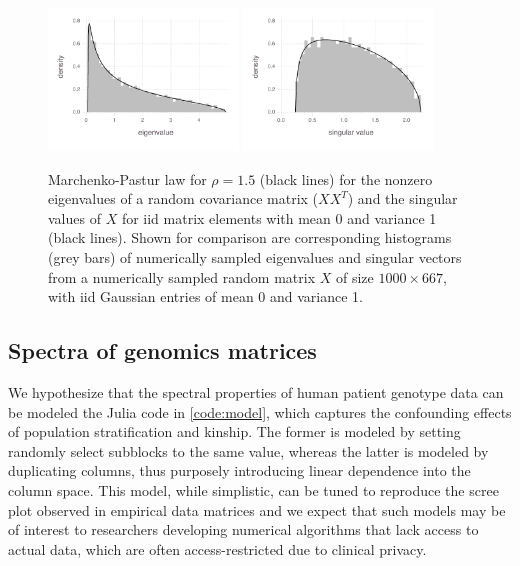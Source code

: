 \documentclass[final,leqno]{siamltex1213}
\begin{document}
\begin{figure}
\caption{Marchenko-Pastur law for $\rho=1.5$ (black lines) for the nonzero
eigenvalues of a random covariance matrix ($XX^{T}$) and the singular
values of $X$ for iid matrix elements with mean 0 and variance 1
(black lines). Shown for comparison are corresponding histograms (grey
bars) of numerically sampled eigenvalues and singular vectors from
a numerically sampled random matrix $X$ of size $1000\times667$,
with iid Gaussian entries of mean 0 and variance 1.
\label{fig:mplaw}
}

\includegraphics[width=0.45\textwidth]{fig/mplaw/fig-mplaw-ev}
%
\includegraphics[width=0.45\textwidth]{fig/mplaw/fig-mplaw-sv}
\end{figure}



\subsection{Spectra of genomics matrices}


We hypothesize that the spectral properties of human patient genotype data can
be modeled the Julia code in \ref{code:model}, which captures the confounding
effects of population stratification and kinship. The former is modeled by
setting randomly select subblocks to the same value, whereas the latter is
modeled by duplicating columns, thus purposely introducing linear dependence into
the column space. This model, while simplistic, can be tuned to reproduce the
scree plot observed in empirical data matrices and we expect that such models
may be of interest to researchers developing numerical algorithms that lack
access to actual data, which are often access-restricted due to clinical privacy.
\end{document}
